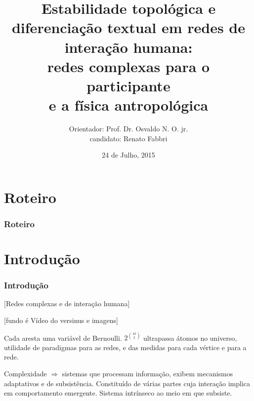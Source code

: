 \documentclass[10pt]{beamer}
\begin{document}
\title {\bfseries{\sc\large Estabilidade topológica e diferenciação textual
em redes de interação humana: \\
redes complexas para o participante\\
e a física antropológica
}}


\author[Renato Fabbri]{\small {Orientador: Prof. Dr. Osvaldo N. O. jr.\\
		candidato: Renato Fabbri\\
}}

\date{\small 24 de Julho, 2015} 
\begin{frame}
\titlepage
\end{frame}
\section*{Roteiro}
\begin{frame}
\frametitle{Roteiro}  
\tableofcontents
\end{frame}

\section{Introdução}
\begin{frame}
\frametitle{Introdução}
[Redes complexas e de interação humana]


[fundo é Vídeo do versinus e imagens]

\vspace{1cm}

Cada aresta uma variável de Bernoulli.
$2^{42 \choose 2}$ ultrapassa átomos no universo,
utilidade de paradigmas para as redes,
e das medidas para cada vértice e para a rede.

\vspace{1cm}

Complexidade $\Rightarrow$ sistemas que processam informação,
exibem mecanismos adaptativos e de subsistência.
Constituído de várias partes cuja interação implica
em comportamento emergente. Sistema intrínseco ao meio
em que subsiste.
\end{frame}
\end{document}

